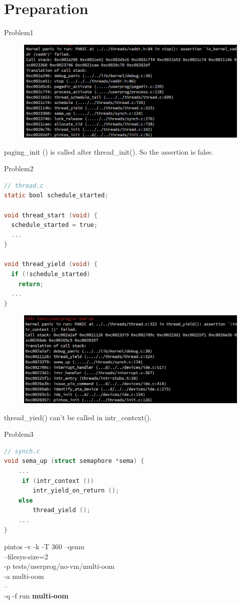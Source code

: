 \documentclass[10pt]{beamer}
\begin{document}
\section{Preparation}
\begin{frame}[fragile]{Problem1}
    \begin{figure}
        \centering
    \includegraphics[width=\linewidth]{figures/erro1.png}
    \end{figure}
  paging\_init () is called after thread\_init(). So the assertion is false.
\end{frame}
\begin{frame}[fragile]{Problem2}
    \begin{lstlisting}[language=C]
// thread.c
static bool schedule_started;

void thread_start (void) {
  schedule_started = true;
  ...
}

void thread_yield (void) {
  if (!schedule_started)
    return;
  ...
}
    \end{lstlisting}
\begin{figure}
    \centering
    \includegraphics[width=0.8\linewidth]{figures/erro2.png}
\end{figure}
thread\_yied() can't be called in intr\_context().
\end{frame}
\begin{frame}[fragile]{Problem3}
    \begin{lstlisting}[language=C]
// synch.c
void sema_up (struct semaphore *sema) {
    ...
     if (intr_context ())
        intr_yield_on_return ();
    else
        thread_yield ();
    ...
}
    \end{lstlisting}
    pintos -v -k -T 360 --qemu\\  
    --filesys-size=2 \\
    -p tests/userprog/no-vm/multi-oom\\
    -a multi-oom \\ 
    -- \\
    -q  -f run \textbf{multi-oom} 
\end{frame}
\end{document}
